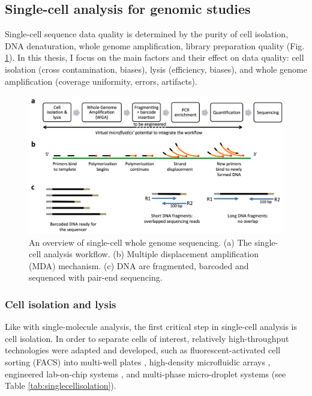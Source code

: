 \subsection{Single-cell analysis for genomic studies}
Single-cell sequence data quality is determined by the purity of cell isolation, DNA denaturation, whole genome amplification, library preparation quality (Fig. \ref{fig:Intro}). In this thesis, I focus on the main factors and their effect on data quality: cell isolation (cross contamination, biases), lysis (efficiency, biases), and whole genome amplification (coverage uniformity, errors, artifacts).

\begin{figure}[ht!]
\centering
\includegraphics[keepaspectratio,width=\textwidth]{./figures/Introduction_Sequencing}
\caption[An overview of single-cell whole genome sequencing]{An overview of single-cell whole genome sequencing. (a) The single-cell analysis workflow. (b) Multiple displacement amplification (MDA) mechanism. (c) DNA are fragmented, barcoded and sequenced with pair-end sequencing.}
\label{fig:Intro}
\end{figure}

\subsubsection{Cell isolation and lysis} 
Like with single-molecule analysis, the first critical step in single-cell analysis is cell isolation. In order to separate cells of interest, relatively high-throughput technologies were adapted and developed, such as fluorescent-activated cell sorting (FACS) into multi-well plates \cite{Zhang:2006hq}, high-density microfluidic arrays \cite{Love:2013hf}, engineered lab-on-chip systems \cite{Thorsen:2002dn,Landry:2013dh,deBourcy:2014ji, Marcy:2007ip}, and multi-phase micro-droplet systems \cite{Fu:2015gl,Thorsen:2001td,Morinishi:2015jx,Mazutis:2013wn,Hindson:2013hb} (see Table \ref{tab:singlecellisolation}). %

